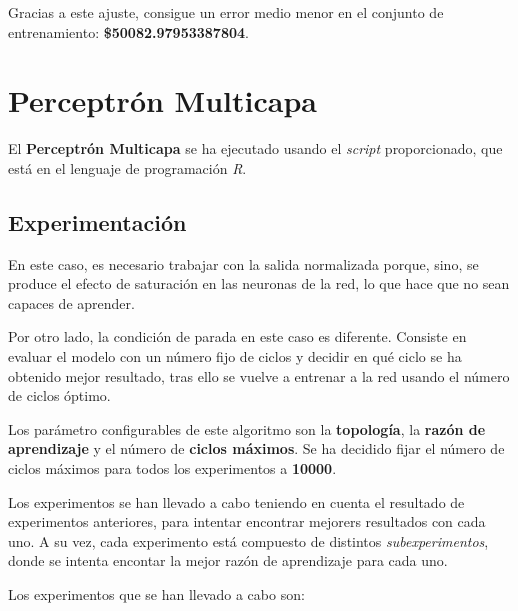 \documentclass{uc3mpracticas}
\begin{document}
      Gracias a este ajuste, consigue un error medio menor en el conjunto de entrenamiento: \textbf{\$50082.97953387804}.

  \section{Perceptrón Multicapa}

  El \textbf{Perceptrón Multicapa} se ha ejecutado usando el \textit{script} proporcionado, que está en el lenguaje de programación \textit{R}.


    \subsection{Experimentación}

    En este caso, es necesario trabajar con la salida normalizada porque, sino, se produce el efecto de saturación en las neuronas de la red, lo que hace que no sean capaces de aprender.

    \vspace{2mm}

    Por otro lado, la condición de parada en este caso es diferente. Consiste en evaluar el modelo con un número fijo de ciclos y decidir en qué ciclo se ha obtenido mejor resultado, tras ello se vuelve a entrenar a la red usando el número de ciclos óptimo.

    \vspace{2mm}

    Los parámetro configurables de este algoritmo son la \textbf{topología}, la \textbf{razón de aprendizaje} y el número de \textbf{ciclos máximos}. Se ha decidido fijar el número de ciclos máximos para todos los experimentos a \textbf{10000}.

    \vspace{2mm}

    Los experimentos se han llevado a cabo teniendo en cuenta el resultado de experimentos anteriores, para intentar encontrar mejorers resultados con cada uno. A su vez, cada experimento está compuesto de distintos \textit{subexperimentos}, donde se intenta encontar la mejor razón de aprendizaje para cada uno.

    \vspace{2mm}

    Los experimentos que se han llevado a cabo son:
\end{document}
